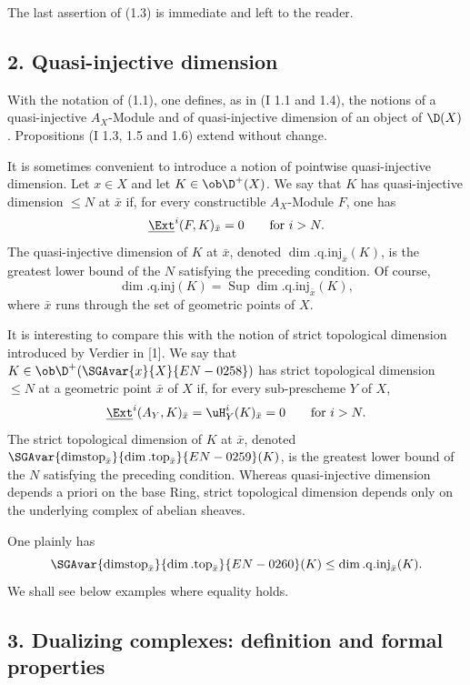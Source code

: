The last assertion of (1.3) is immediate and left to the reader.

\subsection*{2. Quasi-injective dimension}

With the notation of (1.1), one defines, as in (I 1.1 and 1.4), the notions of a quasi-injective $A_X$-Module and of quasi-injective dimension of an object of $\D(X)$. Propositions (I 1.3, 1.5 and 1.6) extend without change.

It is sometimes convenient to introduce a notion of pointwise quasi-injective dimension. Let $x\in X$ and let $K\in\ob\D^+(X)$. We say that $K$ has quasi-injective dimension $\leq N$ at $\bar{x}$ if, for every constructible $A_X$-Module $F$, one has
\[
        \underline{\Ext}^{i}(F,K)_{\bar{x}}=0\qquad\text{for }i>N.
\]
The quasi-injective dimension of $K$ at $\bar{x}$, denoted $\dim.\mathrm{q.inj}_{\bar{x}}(K)$, is the greatest lower bound of the $N$ satisfying the preceding condition. Of course,
\[
        \dim.\mathrm{q.inj}(K)=\operatorname{Sup}\dim.\mathrm{q.inj}_{\bar{x}}(K),
\]
where $\bar{x}$ runs through the set of geometric points of $X$.

It is interesting to compare this with the notion of strict topological dimension introduced by Verdier in [1]. We say that $K\in\ob\D^+(\SGAvar{x}{X}{EN-0258})$ has strict topological dimension $\leq N$ at a geometric point $\bar{x}$ of $X$ if, for every sub-prescheme $Y$ of $X$,
\[
        \underline{\Ext}^{i}(A_Y,K)_{\bar{x}}=\uH^i_Y(K)_{\bar{x}}=0\qquad\text{for }i>N.
\]
The strict topological dimension of $K$ at $\bar{x}$, denoted $\SGAvar{\operatorname{dimstop}_{\bar{x}}}{\dim.\mathrm{top}_{\bar{x}}}{EN-0259}(K)$, is the greatest lower bound of the $N$ satisfying the preceding condition. Whereas quasi-injective dimension depends a priori on the base Ring, strict topological dimension depends only on the underlying complex of abelian sheaves.

One plainly has
\[
        \SGAvar{\operatorname{dimstop}_{\bar{x}}}{\dim.\mathrm{top}_{\bar{x}}}{EN-0260}(K)\leq \dim.\mathrm{q.inj}_{\bar{x}}(K).
\]
We shall see below examples where equality holds.

\subsection*{3. Dualizing complexes: definition and formal properties}

